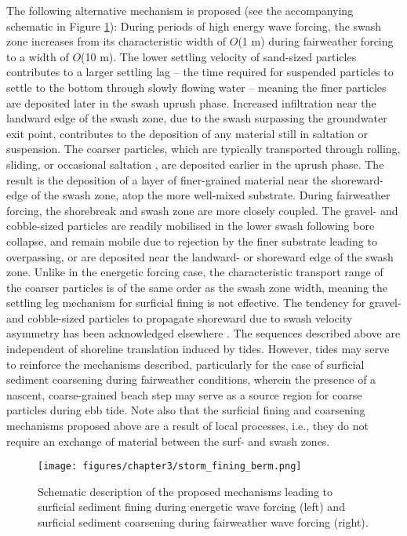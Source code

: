 \documentclass[jmse,article,submit,pdftex,moreauthors]{Definitions/mdpi}
\begin{document}
The following alternative mechanism is proposed (see the accompanying schematic in Figure \ref{fig:storm_fining}): During periods of high energy wave forcing, the swash zone increases from its characteristic width of $O$(1 m) during fairweather forcing to a width of $O$(10 m). The lower settling velocity of sand-sized particles contributes to a larger settling lag -- the time required for suspended particles to settle to the bottom through slowly flowing water \citep{Masselink_Puleo2006} -- meaning the finer particles are deposited later in the swash uprush phase. Increased infiltration near the landward edge of the swash zone, due to the swash surpassing the groundwater exit point, contributes to the deposition of any material still in saltation or suspension. The coarser particles, which are typically transported through rolling, sliding, or occasional saltation \citep{Carter_Orford1984}, are deposited earlier in the uprush phase. The result is the deposition of a layer of finer-grained material near the shoreward-edge of the swash zone, atop the more well-mixed substrate. During fairweather forcing, the shorebreak and swash zone are more closely coupled. The gravel- and cobble-sized particles are readily mobilised in the lower swash following bore collapse, and remain mobile due to rejection by the finer substrate leading to overpassing, or are deposited near the landward- or shoreward edge of the swash zone. Unlike in the energetic forcing case, the characteristic transport range of the coarser particles is of the same order as the swash zone width, meaning the settling leg mechanism for surficial fining is not effective. The tendency for gravel- and cobble-sized particles to propagate shoreward due to swash velocity asymmetry has been acknowledged elsewhere \citep{Carr1983}. The sequences described above are independent of shoreline translation induced by tides. However, tides may serve to reinforce the mechanisms described, particularly for the case of surficial sediment coarsening during fairweather conditions, wherein the presence of a nascent, coarse-grained beach step may serve as a source region for coarse particles during ebb tide. Note also that the surficial fining and coarsening mechanisms proposed above are a result of local processes, i.e., they do not require an exchange of material between the surf- and swash zones.

\begin{figure}[tbp] %
	\begin{center}
		\texttt{[image: figures/chapter3/storm\_fining\_berm.png]}
		\caption[Schematic description of surficial sediment fining mechanisms during energetic wave forcing]{Schematic description of the proposed mechanisms leading to surficial sediment fining during energetic wave forcing (left) and surficial sediment coarsening during fairweather wave forcing (right).}
		\label{fig:storm_fining}
	\end{center}
\end{figure}
\end{document}
